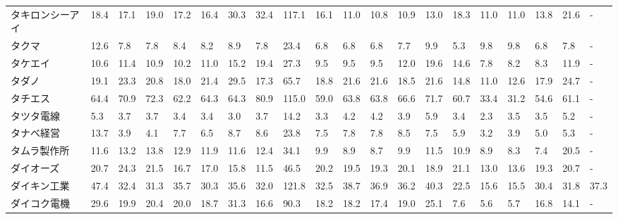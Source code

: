 \begin{longtable}[c]{lp{3mm}p{3mm}p{3mm}p{3mm}p{3mm}p{3mm}p{3mm}p{3mm}p{3mm}p{3mm}p{3mm}p{3mm}p{3mm}p{3mm}p{3mm}p{3mm}p{3mm}p{3mm}p{3mm}}
タキロンシーアイ        &   18.4 &   17.1 &      19.0 &      17.2 &       16.4 &    30.3 &    32.4 &    117.1 &    16.1 &    11.0 &   10.8 &   10.9 &    13.0 &    18.3 &    11.0 &   11.0 &   13.8 &    21.6 &      - \\
タクマ             &   12.6 &    7.8 &       7.8 &       8.4 &        8.2 &     8.9 &     7.8 &     23.4 &     6.8 &     6.8 &    6.8 &    7.7 &     9.9 &     5.3 &     9.8 &    9.8 &    6.8 &     7.8 &      - \\
タケエイ            &   10.6 &   11.4 &      10.9 &      10.2 &       11.0 &    15.2 &    19.4 &     27.3 &     9.5 &     9.5 &    9.5 &   12.0 &    19.6 &    14.6 &     7.8 &    8.2 &    8.3 &    11.9 &      - \\
タダノ             &   19.1 &   23.3 &      20.8 &      18.0 &       21.4 &    29.5 &    17.3 &     65.7 &    18.8 &    21.6 &   21.6 &   18.5 &    21.6 &    14.8 &    11.0 &   12.6 &   17.9 &    24.7 &      - \\
タチエス            &   64.4 &   70.9 &      72.3 &      62.2 &       64.3 &    64.3 &    80.9 &    115.0 &    59.0 &    63.8 &   63.8 &   66.6 &    71.7 &    60.7 &    33.4 &   31.2 &   54.6 &    61.1 &      - \\
タツタ電線           &    5.3 &    3.7 &       3.7 &       3.4 &        3.4 &     3.0 &     3.7 &     14.2 &     3.3 &     4.2 &    4.2 &    3.9 &     5.9 &     3.4 &     2.3 &    3.5 &    3.5 &     5.2 &      - \\
タナベ経営           &   13.7 &    3.9 &       4.1 &       7.7 &        6.5 &     8.7 &     8.6 &     23.8 &     7.5 &     7.8 &    7.8 &    8.5 &     7.5 &     5.9 &     3.2 &    3.9 &    5.0 &     5.3 &      - \\
タムラ製作所          &   11.6 &   13.2 &      13.8 &      12.9 &       11.9 &    11.6 &    12.4 &     34.1 &     9.9 &     8.9 &    8.7 &    9.9 &    11.5 &    10.9 &     8.9 &    8.3 &    7.4 &    20.5 &      - \\
ダイオーズ           &   20.7 &   24.3 &      21.5 &      16.7 &       17.0 &    15.8 &    11.5 &     46.5 &    20.2 &    19.5 &   19.3 &   20.1 &    18.9 &    21.1 &    13.0 &   13.6 &   19.3 &    20.7 &      - \\
ダイキン工業          &   47.4 &   32.4 &      31.3 &      35.7 &       30.3 &    35.6 &    32.0 &    121.8 &    32.5 &    38.7 &   36.9 &   36.2 &    40.3 &    22.5 &    15.6 &   15.5 &   30.4 &    31.8 &   37.3 \\
ダイコク電機          &   29.6 &   19.9 &      20.4 &      20.0 &       18.7 &    31.3 &    16.6 &     90.3 &    18.2 &    18.2 &   17.4 &   19.0 &    25.1 &     7.6 &     5.6 &    5.7 &   16.8 &    14.1 &      - \\

\end{longtable}
